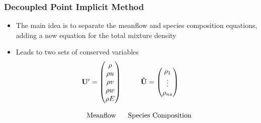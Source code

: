 \documentclass{beamer}
\begin{document}
\begin{frame}
  \frametitle{Decoupled Point Implicit Method}
  \begin{itemize}
    \item The main idea is to separate the meanflow and species composition
      equations, adding a new equation for the total mixture density
    \item Leads to two sets of conserved variables
      \begin{equation*}
      	\begin{matrix}
      		\mathbf U'=\begin{pmatrix}
      			\rho \\
      			\rho u \\
      			\rho v \\
      			\rho w \\
      			\rho E
      		\end{pmatrix} &
      		\mathbf{\hat{U}}=\begin{pmatrix}
      			\rho_1 \\
      			\vdots \\
      			\rho_{ns}
      		\end{pmatrix} \\ \\
          \text{Meanflow} & \text{Species Composition}
      	\end{matrix} 
      \end{equation*}
  \end{itemize}
\end{frame}
\end{document}

